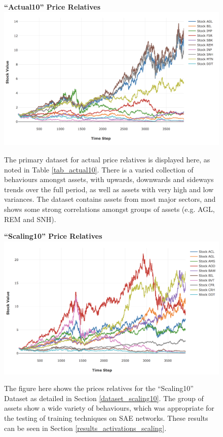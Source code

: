 \documentclass[a4paper,11pt,oneside]{article}
\theoremstyle{plain}
\theoremstyle{definition}
\begin{document}
	\begin{figure}[H]
		\centering
		\textbf{``Actual10'' Price Relatives}
		\includegraphics[scale=0.45]{images/results/prices/actual10_prices.png} 
		\caption[``Actual10'' Price Relatives]{The primary dataset for actual price relatives is displayed here, as noted in Table \ref{tab_actual10}. There is a varied collection of behaviours amongst assets, with upwards, downwards and sideways trends over the full period, as well as assets with very high and low variances. The dataset contains assets from most major sectors, and shows some strong correlations amongst groups of assets (e.g. AGL, REM and SNH). }
		\label{figure-actual10_prices}
	\end{figure}
	
	\begin{figure}[H]
		\centering
		\textbf{``Scaling10'' Price Relatives}
		\includegraphics[scale=0.45]{images/results/prices/scaling10_prices.png} 
		\caption[``Scaling10'' Price Relatives]{The figure here shows the prices relatives for the ``Scaling10'' Dataset as detailed in Section \ref{dataset_scaling10}. The group of assets show a wide variety of behaviours, which was appropriate for the testing of training techniques on SAE networks. These results can be seen in Section \ref{results_activations_scaling}.}
		\label{figure-scaling10_prices}
	\end{figure}
	
\end{document}
